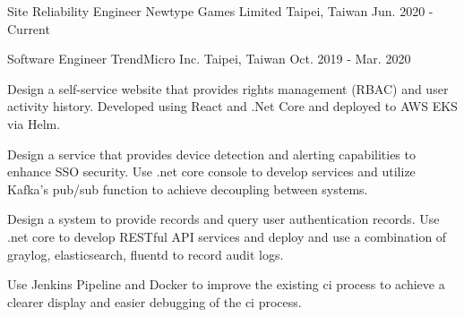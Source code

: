 

\begin{cventries}

\cventry
{Site Reliability Engineer} %
{Newtype Games Limited} %
{Taipei, Taiwan} %
{Jun. 2020 - Current} %
{
  \begin{cvitems} %
    \item {}
  \end{cvitems}
}

\cventry
{Software Engineer} %
{TrendMicro Inc.} %
{Taipei, Taiwan} %
{Oct. 2019 - Mar. 2020} %
{
  \begin{cvitems} %
    \item {Design a self-service website that provides rights management (RBAC) and user activity history. Developed using React and .Net Core and deployed to AWS EKS via Helm.}
    \item {Design a service that provides device detection and alerting capabilities to enhance SSO security. Use .net core console to develop services and utilize Kafka's pub/sub function to achieve decoupling between systems.}
    \item {Design a system to provide records and query user authentication records. Use .net core to develop RESTful API services and deploy and use a combination of graylog, elasticsearch, fluentd to record audit logs.}
    \item {Use Jenkins Pipeline and Docker to improve the existing ci process to achieve a clearer display and easier debugging of the ci process.}
  \end{cvitems}
}


\end{cventries}
